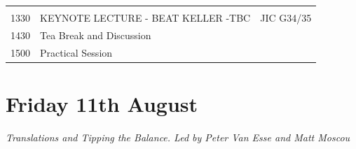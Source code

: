 \documentclass[12pt,]{book}
\begin{document}
\begin{longtable}[]{@{}lll@{}}
\begin{minipage}[t]{0.13\columnwidth}
\end{minipage}\tabularnewline
\begin{minipage}[t]{0.09\columnwidth}\raggedright\strut
1330\strut
\end{minipage} & \begin{minipage}[t]{0.38\columnwidth}\raggedright\strut
KEYNOTE LECTURE - BEAT KELLER -TBC\strut
\end{minipage} & \begin{minipage}[t]{0.13\columnwidth}\raggedright\strut
JIC G34/35\strut
\end{minipage}\tabularnewline
\begin{minipage}[t]{0.09\columnwidth}\raggedright\strut
1430\strut
\end{minipage} & \begin{minipage}[t]{0.38\columnwidth}\raggedright\strut
Tea Break and Discussion\strut
\end{minipage} & \begin{minipage}[t]{0.13\columnwidth}\raggedright\strut
\strut
\end{minipage}\tabularnewline
\begin{minipage}[t]{0.09\columnwidth}\raggedright\strut
1500\strut
\end{minipage} & \begin{minipage}[t]{0.38\columnwidth}\raggedright\strut
Practical Session\strut
\end{minipage} & \begin{minipage}[t]{0.13\columnwidth}\raggedright\strut
\strut
\end{minipage}\tabularnewline
\bottomrule
\end{longtable}

\section*{Friday 11th August}\label{friday-11th-august}

\emph{Translations and Tipping the Balance. Led by Peter Van Esse and
Matt Moscou}
\end{document}
